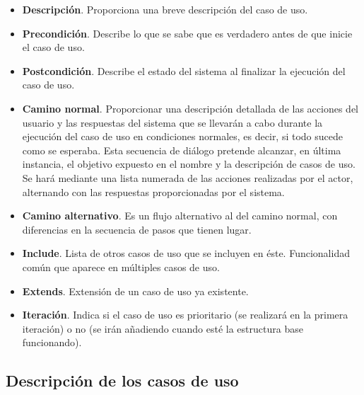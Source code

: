\documentclass[a4paper,oneside,11pt]{book}
\begin{document}
\begin{itemize}
				\item \textbf{Descripción}. Proporciona una breve descripción del caso de uso.
				
				\item \textbf{Precondición}. Describe lo que se sabe que es verdadero antes de que inicie el caso de uso. 
				
				\item \textbf{Postcondición}. Describe el estado del sistema al finalizar la ejecución del caso de uso.
				
				\item \textbf{Camino normal}. Proporcionar una descripción detallada de las acciones del usuario y las respuestas del sistema que se llevarán a cabo durante la ejecución del caso de uso en condiciones normales, es decir, si todo sucede como se esperaba. Esta secuencia de diálogo pretende alcanzar, en última instancia, el objetivo expuesto en el nombre y la descripción de casos de uso. Se hará mediante una lista numerada de las acciones realizadas por el actor, alternando con las respuestas proporcionadas por el sistema.
				
				\item \textbf{Camino alternativo}. Es un flujo alternativo al del camino normal, con diferencias en la secuencia de pasos que tienen lugar. 
				
				\item \textbf{Include}. Lista de otros casos de uso que se incluyen en éste. Funcionalidad común que aparece en múltiples casos de uso.
				
				\item \textbf{Extends}. Extensión de un caso de uso ya existente.
				
				\item \textbf{Iteración}. Indica si el caso de uso es prioritario (se realizará en la primera iteración) o no (se irán añadiendo cuando esté la estructura base funcionando).
		
			\end{itemize}
		
		
		\subsection{Descripción de los casos de uso} %
		\label{sub:descripcion_de_los_casos_de_uso}
		
\end{document}

